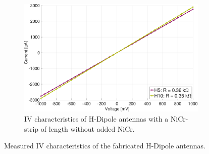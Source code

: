 \begin{figure}[ht]
    \begin{subfigure}[b]{0.49\textwidth}
        \centering
        \includegraphics[width=\textwidth]{figures/IV/IV_H5_H10.pdf}
        \caption{IV characteristics of H-Dipole antennas with a NiCr-strip of length without added NiCr.}
        \label{fig:sub5}
    \end{subfigure}

    \caption{Measured IV characteristics of the fabricated H-Dipole antennas.}
    \label{fig:main_IV_dipoles}
\end{figure}
